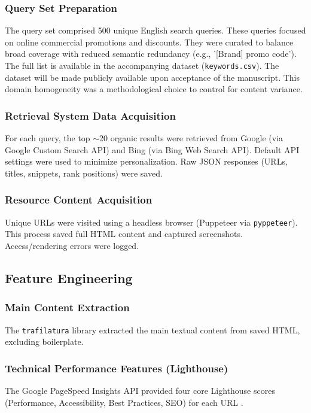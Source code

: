 \documentclass[a4paper,fleqn]{cas-sc}
\begin{document}
\subsubsection{Query Set Preparation}
\label{subsubsec:queries}
The query set comprised 500 unique English search queries. These queries focused on online commercial promotions and discounts. They were curated to balance broad coverage with reduced semantic redundancy (e.g., '[Brand] promo code'). The full list is available in the accompanying dataset (\texttt{keywords.csv}). The dataset will be made publicly available upon acceptance of the manuscript. This domain homogeneity was a methodological choice to control for content variance.

\subsubsection{Retrieval System Data Acquisition}
\label{subsubsec:serp_acq}
For each query, the top $\sim$20 organic results were retrieved from Google (via Google Custom Search API) and Bing (via Bing Web Search API). Default API settings were used to minimize personalization. Raw JSON responses (URLs, titles, snippets, rank positions) were saved.

\subsubsection{Resource Content Acquisition}
\label{subsubsec:content_acq}
Unique URLs were visited using a headless browser (Puppeteer via \texttt{pyppeteer}). This process saved full HTML content and captured screenshots. Access/rendering errors were logged.

\subsection{Feature Engineering}
\label{subsec:features}
\subsubsection{Main Content Extraction}
\label{subsubsec:trafilatura}
The \texttt{trafilatura} library \citep{Barbaresi2021} extracted the main textual content from saved HTML, excluding boilerplate.

\subsubsection{Technical Performance Features (Lighthouse)}
\label{subsubsec:lighthouse}
The Google PageSpeed Insights API provided four core Lighthouse scores (Performance, Accessibility, Best Practices, SEO) for each URL \citep{Roumeliotis2022}.
\end{document}
